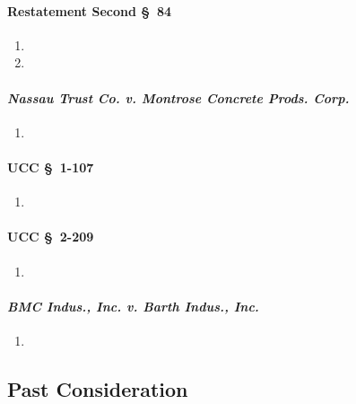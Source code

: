 \paragraph{Restatement Second \S\ 84}

\begin{enumerate}
    \item %
    \item %
\end{enumerate}

\paragraph{\emph{Nassau Trust Co. v. Montrose Concrete Prods. Corp.}}

\begin{enumerate}
    \item %
\end{enumerate}

\paragraph{UCC \S\ 1-107}

\begin{enumerate}
    \item %
\end{enumerate}

\paragraph{UCC \S\ 2-209}

\begin{enumerate}
    \item %
\end{enumerate}

\paragraph{\emph{BMC Indus., Inc. v. Barth Indus., Inc.}}

\begin{enumerate}
    \item %
\end{enumerate}

\subsection{Past Consideration}

